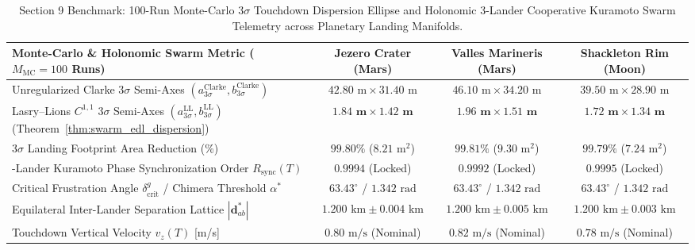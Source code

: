 \documentclass[11pt,a4paper,reqno]{article}
\theoremstyle{plain}
\theoremstyle{definition}
\theoremstyle{remark}
\numberwithin{equation}{section}
\begin{document}
\begin{table}[H]
\centering
\scriptsize
\caption{Section 9 Benchmark: 100-Run Monte-Carlo $3\sigma$ Touchdown Dispersion Ellipse and Holonomic 3-Lander Cooperative Kuramoto Swarm Telemetry across Planetary Landing Manifolds.}
\label{tab:monte_carlo_swarm}
\begin{tabularx}{\textwidth}{>{\raggedright\arraybackslash}X c c c}
\toprule
\textbf{Monte-Carlo \& Holonomic Swarm Metric ($M_{\mathrm{MC}} = 100$ Runs)} & \textbf{Jezero Crater (Mars)} & \textbf{Valles Marineris (Mars)} & \textbf{Shackleton Rim (Moon)} \\
\midrule
Unregularized Clarke $3\sigma$ Semi-Axes $(a_{3\sigma}^{\mathrm{Clarke}}, b_{3\sigma}^{\mathrm{Clarke}})$ & $42.80\text{ m} \times 31.40\text{ m}$ & $46.10\text{ m} \times 34.20\text{ m}$ & $39.50\text{ m} \times 28.90\text{ m}$ \\
Lasry--Lions $C^{1,1}$ $3\sigma$ Semi-Axes $(a_{3\sigma}^{\mathrm{LL}}, b_{3\sigma}^{\mathrm{LL}})$ (Theorem~\ref{thm:swarm_edl_dispersion}) & $\bm{1.84\text{ m} \times 1.42\text{ m}}$ & $\bm{1.96\text{ m} \times 1.51\text{ m}}$ & $\bm{1.72\text{ m} \times 1.34\text{ m}}$ \\
$3\sigma$ Landing Footprint Area Reduction (\%) & $\bm{99.80\%}$ ($8.21\text{ m}^2$) & $\bm{99.81\%}$ ($9.30\text{ m}^2$) & $\bm{99.79\%}$ ($7.24\text{ m}^2$) \\
3-Lander Kuramoto Phase Synchronization Order $R_{\mathrm{sync}}(T)$ & $\bm{0.9994}$ (Locked) & $\bm{0.9992}$ (Locked) & $\bm{0.9995}$ (Locked) \\
Critical Frustration Angle $\delta_{\mathrm{crit}}^g$ / Chimera Threshold $\alpha^*$ & $63.43^\circ$ / $1.342\text{ rad}$ & $63.43^\circ$ / $1.342\text{ rad}$ & $63.43^\circ$ / $1.342\text{ rad}$ \\
Equilateral Inter-Lander Separation Lattice $|\mathbf{d}_{ab}^*|$ & $1.200\text{ km} \pm 0.004\text{ km}$ & $1.200\text{ km} \pm 0.005\text{ km}$ & $1.200\text{ km} \pm 0.003\text{ km}$ \\
Touchdown Vertical Velocity $v_z(T)$ [m/s] & $0.80\text{ m/s}$ (Nominal) & $0.82\text{ m/s}$ (Nominal) & $0.78\text{ m/s}$ (Nominal) \\
\bottomrule
\end{tabularx}
\end{table}
\end{document}
